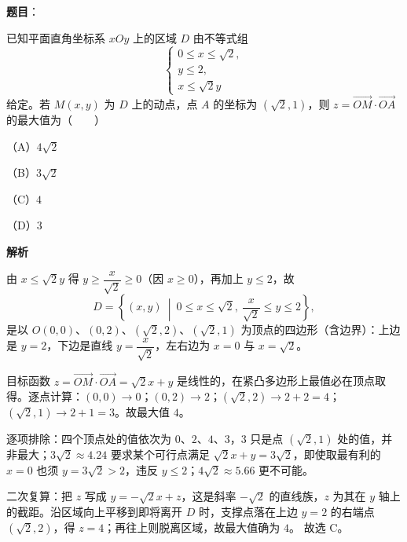 \begin{answer}

\textbf{题目}：

已知平面直角坐标系 $xOy$ 上的区域 $D$ 由不等式组
\nopagebreak[4]
\[\begin{cases}
0\leqslant x\leqslant\sqrt2,\\
y\leqslant 2,\\
x\leqslant\sqrt2y
\end{cases}\]
给定。若 $M(x,y)$ 为 $D$ 上的动点，点 $A$ 的坐标为 $(\sqrt2,1)$，则 $z=\overrightarrow{OM}\cdot\overrightarrow{OA}$ 的最大值为\mbox{（　　）}

（A）$4\sqrt2$

（B）$3\sqrt2$

（C）$4$

（D）$3$

\textbf{解析}

由 $x\leqslant\sqrt2y$ 得 $y\geqslant\dfrac{x}{\sqrt2}\geqslant0$（因 $x\geqslant0$），再加上 $y\leqslant2$，故
\nopagebreak[4]
\[D=\left\{(x,y)\ \middle|\ 0\leqslant x\leqslant\sqrt2,\ \frac{x}{\sqrt2}\leqslant y\leqslant2\right\},\]
是以 $O(0,0)$、$(0,2)$、$(\sqrt2,2)$、$(\sqrt2,1)$ 为顶点的四边形（含边界）：上边是 $y=2$，下边是直线 $y=\dfrac{x}{\sqrt2}$，左右边为 $x=0$ 与 $x=\sqrt2$。

目标函数 $z=\overrightarrow{OM}\cdot\overrightarrow{OA}=\sqrt2x+y$ 是线性的，在紧凸多边形上最值必在顶点取得。逐点计算：$(0,0)\to0$；$(0,2)\to2$；$(\sqrt2,2)\to2+2=4$；$(\sqrt2,1)\to2+1=3$。故最大值 $4$。

逐项排除：四个顶点处的值依次为 $0$、$2$、$4$、$3$，$3$ 只是点 $(\sqrt2,1)$ 处的值，并非最大；$3\sqrt2\approx4.24$ 要求某个可行点满足 $\sqrt2x+y=3\sqrt2$，即使取最有利的 $x=0$ 也须 $y=3\sqrt2>2$，违反 $y\leqslant2$；$4\sqrt2\approx5.66$ 更不可能。

二次复算：把 $z$ 写成 $y=-\sqrt2x+z$，这是斜率 $-\sqrt2$ 的直线族，$z$ 为其在 $y$ 轴上的截距。沿区域向上平移到即将离开 $D$ 时，支撑点落在上边 $y=2$ 的右端点 $(\sqrt2,2)$，得 $z=4$；再往上则脱离区域，故最大值确为 $4$。
故选 C。


\end{answer}
